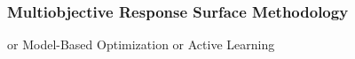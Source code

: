 \documentclass[aspectratio=169]{beamer}
\begin{document}
\begin{frame}\frametitle{Multiobjective Response Surface Methodology}
{or Model-Based Optimization or Active Learning}
\begin{columns}
\begin{column}{0.4\textwidth}
\begin{center}
\medskip
\vskip 0.5cm
\medskip
{}
\end{center}
\end{column}
\begin{column}{0.2\textwidth}
\begin{center}
\\
\vskip 1.2cm
\\
\vskip 1cm
\end{center}
\end{column}
\begin{column}{0.4\textwidth}
\begin{center}
\\

\end{center}
\end{column}
\end{columns}
\end{frame}
\end{document}

